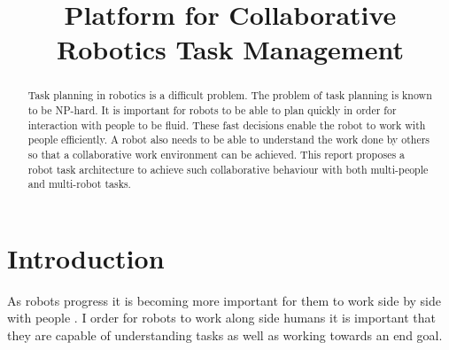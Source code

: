 \documentclass[conference]{IEEEtran}
\begin{document}
\title{Platform for Collaborative Robotics Task Management}

\author{
}

\maketitle

\IEEEpeerreviewmaketitle
\begin{abstract}
Task planning in robotics is a difficult problem. The problem of task planning is known to be NP-hard. It is important for robots to be able to plan quickly in order for interaction with people to be fluid. These fast decisions enable the robot to work with people efficiently. A robot also needs to be able to understand the work done by others so that a collaborative work environment can be achieved. This report proposes a robot task architecture to achieve such collaborative behaviour with both multi-people and multi-robot tasks.
\end{abstract}

\section{Introduction}
As robots progress it is becoming more important for them to work side by side with people \cite{Breazeal2004}. I order for robots to work along side humans it is important that they are capable of understanding tasks as well as working towards an end goal.




\end{document}
